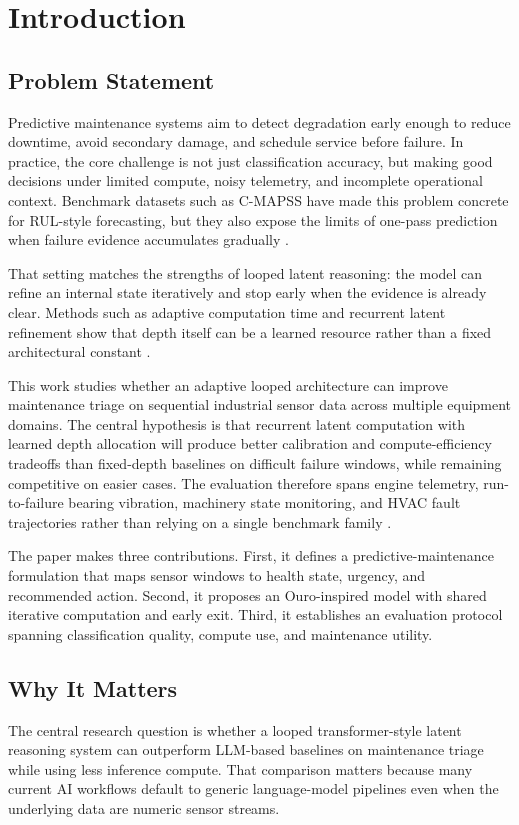 \section{Introduction}
\subsection{Problem Statement}
Predictive maintenance systems aim to detect degradation early enough to reduce downtime, avoid secondary damage, and schedule service before failure. In practice, the core challenge is not just classification accuracy, but making good decisions under limited compute, noisy telemetry, and incomplete operational context. Benchmark datasets such as C-MAPSS have made this problem concrete for RUL-style forecasting, but they also expose the limits of one-pass prediction when failure evidence accumulates gradually \cite{Saxena2008CMAPSS,Ramasso2014CMAPSS}.

That setting matches the strengths of looped latent reasoning: the model can refine an internal state iteratively and stop early when the evidence is already clear. Methods such as adaptive computation time and recurrent latent refinement show that depth itself can be a learned resource rather than a fixed architectural constant \cite{Graves2016ACT,Dehghani2018UniversalTransformers,Zhu2025Ouro}.

This work studies whether an adaptive looped architecture can improve maintenance triage on sequential industrial sensor data across multiple equipment domains. The central hypothesis is that recurrent latent computation with learned depth allocation will produce better calibration and compute-efficiency tradeoffs than fixed-depth baselines on difficult failure windows, while remaining competitive on easier cases. The evaluation therefore spans engine telemetry, run-to-failure bearing vibration, machinery state monitoring, and HVAC fault trajectories rather than relying on a single benchmark family \cite{NASAIMSBearings}.

The paper makes three contributions. First, it defines a predictive-maintenance formulation that maps sensor windows to health state, urgency, and recommended action. Second, it proposes an Ouro-inspired model with shared iterative computation and early exit. Third, it establishes an evaluation protocol spanning classification quality, compute use, and maintenance utility.

\subsection{Why It Matters}
The central research question is whether a looped transformer-style latent reasoning system can outperform LLM-based baselines on maintenance triage while using less inference compute. That comparison matters because many current AI workflows default to generic language-model pipelines even when the underlying data are numeric sensor streams.


